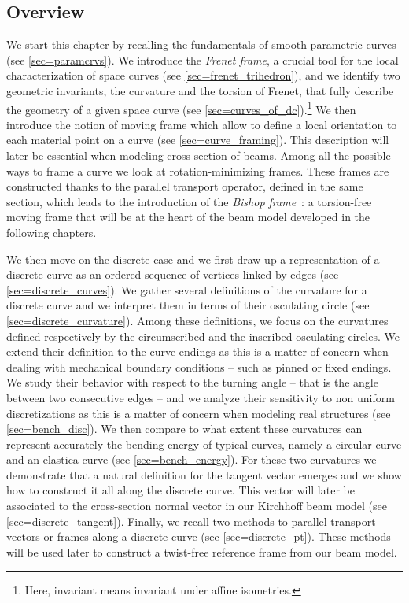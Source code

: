 \subsection{Overview}
We start this chapter by recalling the fundamentals of smooth parametric curves (see \cref{sec=paramcrvs}). We introduce the \emph{Frenet frame}, a crucial tool for the local characterization of space curves (see \cref{sec=frenet_trihedron}), and we identify two geometric invariants, the curvature and the torsion of Frenet, that fully describe the geometry of a given space curve (see \cref{sec=curves_of_dc}).\footnote{Here, invariant means invariant under affine isometries.} We then introduce the notion of moving frame which allow to define a local orientation to each material point on a curve (see \cref{sec=curve_framing}). This description will later be essential when modeling cross-section of beams. Among all the possible ways to frame a curve we look at rotation-minimizing frames. These frames are constructed thanks to the parallel transport operator, defined in the same section, which leads to the introduction of the \emph{Bishop frame}~: a torsion-free moving frame that will be at the heart of the beam model developed in the following chapters.

We then move on the discrete case and we first draw up a representation of a discrete curve as an ordered sequence of vertices linked by edges (see \cref{sec=discrete_curves}). We gather several definitions of the curvature for a discrete curve and we interpret them in terms of their osculating circle (see \cref{sec=discrete_curvature}). Among these definitions, we focus on the curvatures defined respectively by the circumscribed and the inscribed osculating circles. We extend their definition to the curve endings as this is a matter of concern when dealing with mechanical boundary conditions -- such as pinned or fixed endings. We study their behavior with respect to the turning angle -- that is the angle between two consecutive edges -- and we analyze their sensitivity to non uniform discretizations as this is a matter of concern when modeling real structures (see \cref{sec=bench_disc}). We then compare to what extent these curvatures can represent accurately the bending energy of typical curves, namely a circular curve and an elastica curve (see \cref{sec=bench_energy}). For these two curvatures we demonstrate that a natural definition for the tangent vector emerges and we show how to construct it all along the discrete curve. This vector will later be associated to the cross-section normal vector in our Kirchhoff beam model (see \cref{sec=discrete_tangent}). Finally, we recall two methods to parallel transport vectors or frames along a discrete curve (see \cref{sec=discrete_pt}). These methods will be used later to construct a twist-free reference frame from our beam model.

